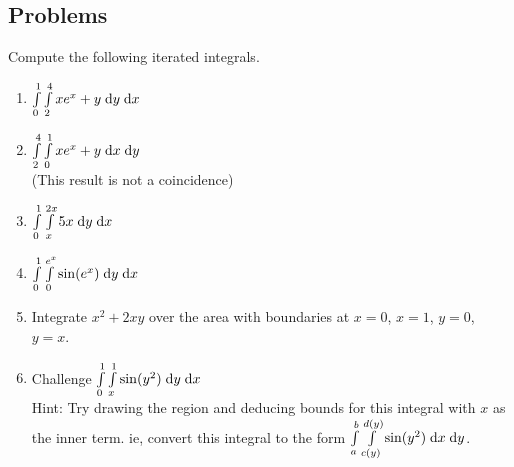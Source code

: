 \documentclass[letterpaper,11pt]{article}
\begin{document}
  \subsection*{Problems}
  Compute the following iterated integrals.

  \begin{enumerate}
    \item $\int \limits_{0}^{1} \int \limits_{2}^{4} x e^{x} + y \;\mathrm{d}y \;\mathrm{d}x$\\
      \newline
      \newline
    \item $\int \limits_{2}^{4} \int \limits_{0}^{1} x e^{x} + y \;\mathrm{d}x \;\mathrm{d}y$\\
      (This result is not a coincidence)\\
      \newline
      \newline
    \item $\int \limits_{0}^{1} \int \limits_{x}^{2 x} 5 x \;\mathrm{d}y \;\mathrm{d}x$\\
      \newline
      \newline
    \item $\int \limits_{0}^{1} \int \limits_{0}^{e^{x}} \sin(e^x) \;\mathrm{d}y \;\mathrm{d}x$\\
      \newline
      \newline
    \item Integrate $x^2 + 2 x y$ over the area with boundaries at $x = 0$, $x = 1$, $y = 0$, $y = x$.\\
      \newline
      \newline
    \item Challenge $\int \limits_{0}^{1} \int \limits_{x}^{1} \sin(y^2) \;\mathrm{d}y \;\mathrm{d}x$\\
      Hint: Try drawing the region and deducing bounds for this integral with $x$ as the inner term.
      ie, convert this integral to the form $\int \limits_{a}^{b} \int \limits_{c(y)}^{d(y)} \sin(y^2) \;\mathrm{d}x \;\mathrm{d}y$.\\
      \newline
      \newline
  \end{enumerate}
\end{document}
